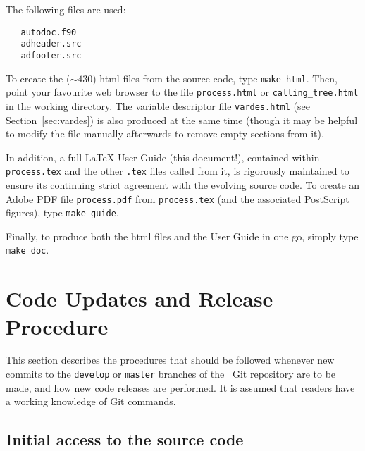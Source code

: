 The following files are used:
\begin{verbatim}
   autodoc.f90
   adheader.src
   adfooter.src
\end{verbatim}
To create the ($\sim 430$) html files from the source code, type
\verb+make html+.  Then, point your favourite web browser to the file
\texttt{process.html} or \texttt{calling\_tree.html} in the working
directory. The variable descriptor file \texttt{vardes.html} (see
Section~\ref{sec:vardes}) is also produced at the same time (though it may be
helpful to modify the file manually afterwards to remove empty sections from
it).

In addition, a full \LaTeX\/ User Guide (this document!), contained within
\texttt{process.tex} and the other \texttt{.tex} files called from it, is
rigorously maintained to ensure its continuing strict agreement with the
evolving source code. To create an Adobe PDF file \texttt{process.pdf} from
\texttt{process.tex} (and the associated PostScript figures), type
\verb+make guide+.

Finally, to produce both the html files and the User Guide in one go, simply
type \verb+make doc+.

\section{Code Updates and Release Procedure}
\label{sec:code_release}

This section describes the procedures that should be followed whenever new
commits to the \texttt{develop} or \texttt{master} branches of the \process\
Git repository are to be made, and how new code releases are performed. It is
assumed that readers have a working knowledge of Git commands.

\subsection{Initial access to the source code}
\label{sec:getsource}

